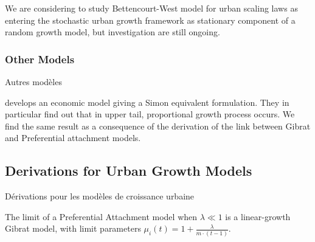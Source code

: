 We are considering to study Bettencourt-West model for urban scaling laws \cite{bettencourt2008large} as entering the stochastic urban growth framework as stationary component of a random growth model, but investigation are still ongoing.



\subsubsection{Other Models}{Autres modèles}

\cite{gabaix1999zipf} develops an economic model giving a Simon equivalent formulation. They in particular find out that in upper tail, proportional growth process occurs. We find the same result as a consequence of the derivation of the link between Gibrat and Preferential attachment models.








\subsection{Derivations for Urban Growth Models}{Dérivations pour les modèles de croissance urbaine}





\begin{lemma}
The limit of a Preferential Attachment model when $\lambda \ll 1$ is a linear-growth Gibrat model, with limit parameters $\mu_i(t)=1+\frac{\lambda}{m\cdot (t-1)}$.
\end{lemma}

